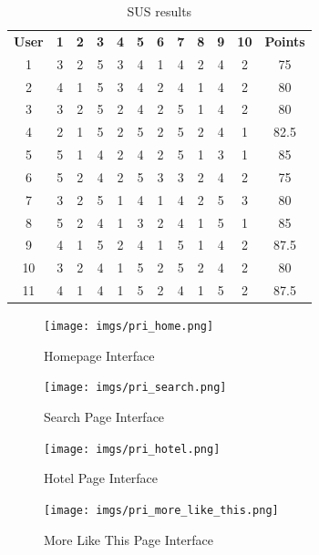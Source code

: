 \documentclass[sigconf]{acmart}
\begin{document}
\begin{table}[htbp]
  \centering
  \caption{SUS results}
  \label{tab:sus_results}
  \begin{tabular}{cccccccccccc}
    \textbf{User}& \textbf{1} & \textbf{2} & \textbf{3} & \textbf{4} & \textbf{5} & \textbf{6} & \textbf{7} & \textbf{8} & \textbf{9} & \textbf{10} & \textbf{Points} \\
    1 & 3 & 2 & 5 & 3 & 4 & 1 & 4 & 2 & 4 & 2 & 75 \\
    2 & 4 & 1 & 5 & 3 & 4 & 2 & 4 & 1 & 4 & 2 & 80 \\
    3 & 3 & 2 & 5 & 2 & 4 & 2 & 5 & 1 & 4 & 2 & 80 \\
    4 & 2 & 1 & 5 & 2 & 5 & 2 & 5 & 2 & 4 & 1 & 82.5 \\
    5 & 5 & 1 & 4 & 2 & 4 & 2 & 5 & 1 & 3 & 1 & 85 \\
    6 & 5 & 2 & 4 & 2 & 5 & 3 & 3 & 2 & 4 & 2 & 75 \\
    7 & 3 & 2 & 5 & 1 & 4 & 1 & 4 & 2 & 5 & 3 & 80 \\
    8 & 5 & 2 & 4 & 1 & 3 & 2 & 4 & 1 & 5 & 1 & 85 \\
    9 & 4 & 1 & 5 & 2 & 4 & 1 & 5 & 1 & 4 & 2 & 87.5 \\
    10 & 3 & 2 & 4 & 1 & 5 & 2 & 5 & 2 & 4 & 2 & 80 \\
    11 & 4 & 1 & 4 & 1 & 5 & 2 & 4 & 1 & 5 & 2 & 87.5 \\
  \end{tabular}
\end{table}

\begin{figure}[H]
  \centering
  \texttt{[image: imgs/pri\_home.png]}
  \caption{Homepage Interface}
  \label{fig:pri_home}
\end{figure}

\begin{figure}[H]
  \centering
  \texttt{[image: imgs/pri\_search.png]}
  \caption{Search Page Interface}
  \label{fig:pri_search}
\end{figure}


\begin{figure}[H]
  \centering
  \texttt{[image: imgs/pri\_hotel.png]}
  \caption{Hotel Page Interface}
  \label{fig:pri_hotel}
\end{figure}

\begin{figure}[H]
  \centering
  \texttt{[image: imgs/pri\_more\_like\_this.png]}
  \caption{More Like This Page Interface}
  \label{fig:pri_mlt}
\end{figure}
\end{document}
